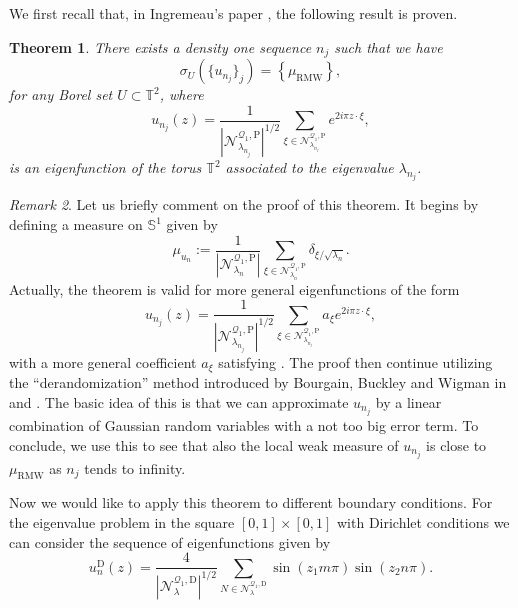 \documentclass{amsart}
\newtheorem{theorem}{Theorem}[section]
\theoremstyle{definition}
\theoremstyle{remark}
\newtheorem{remark}[theorem]{Remark}
\numberwithin{equation}{section}
\theoremstyle{definition}
\theoremstyle{remark}
\newcommand\muRMW{\mu_{\mathrm{RMW}}}
\begin{document}
We first recall that, in Ingremeau's paper \cite{Ingremeau}, the following result is proven.

\begin{theorem}\label{BerryIngremeau}
	There exists a density one sequence $n_j$ such that we have \begin{equation}
		\sigma_{U}\left(\{u_{n_j}\}_j\right)=\left\{\muRMW\right\},
	\end{equation} for any Borel set $U\subset\mathbb{T}^2$, where 
	\begin{equation}
		u_{n_j}(z)=\frac{1}{\left|\mathcal{N}_{\lambda_{n_j}}^{\mathcal{Q}_1,\mathrm{P}}\right|^{1/2}}\sum_{\xi\in\mathcal{N}_{\lambda_{n_j}}^{\mathcal{Q}_1,\mathrm{P}}}e^{2i\pi z\cdot \xi},
	\end{equation} is an eigenfunction of the torus $\mathbb{T}^2$ associated to the eigenvalue $\lambda_{n_j}$.
\end{theorem}
\begin{remark}
	Let us briefly comment on the proof of this theorem. It begins by defining a measure on $\mathbb{S}^1$ given by \begin{equation}
		\mu_{u_n}:=\frac{1}{\left|\mathcal{N}_{\lambda_n}^{\mathcal{Q}_1,\mathrm{P}}\right|}\sum_{\xi\in\mathcal{N}_{\lambda_n}^{\mathcal{Q}_1,\mathrm{P}}}\delta_{\xi/\sqrt{\lambda_{n}}}.
	\end{equation} Actually, the theorem is valid for more general eigenfunctions of the form\begin{equation}
		u_{n_j}(z)=\frac{1}{\left|\mathcal{N}_{\lambda_{n_j}}^{\mathcal{Q}_1,\mathrm{P}}\right|^{1/2}}\sum_{\xi\in\mathcal{N}_{\lambda_{n_j}}^{\mathcal{Q}_1,\mathrm{P}}}a_\xi e^{2i\pi z\cdot \xi},
	\end{equation} with a more general coefficient $a_\xi$ satisfying  \cite[Hypothesis 1]{Ingremeau}. The proof then continue utilizing the ``derandomization'' method introduced by Bourgain, Buckley and Wigman in \cite{Bourgain} and \cite{Buckley}. The basic idea of this is that we can approximate $u_{n_j}$ by a linear combination of Gaussian random variables with a not too big error term. To conclude, we use this to see that also the local weak measure of $u_{n_j}$ is close to $\muRMW$ as $n_j$ tends to infinity.
\end{remark}
Now we would like to apply this theorem to different boundary conditions. For the eigenvalue problem in the square $\left[0,1\right]\times\left[0,1\right]$ with Dirichlet conditions we can consider the sequence of eigenfunctions given by 
\begin{equation}
	u_{n}^\mathrm{D}(z)=\frac{4}{\left|\mathcal{N}_\lambda^{\mathcal{Q}_1,\mathrm{D}}\right|^{1/2}}\sum_{N\in\mathcal{N}_\lambda^{\mathcal{Q}_1,\mathrm{D}}}\sin\left(z_1m\pi\right)\sin\left(z_2n\pi\right).
\end{equation}
\end{document}
